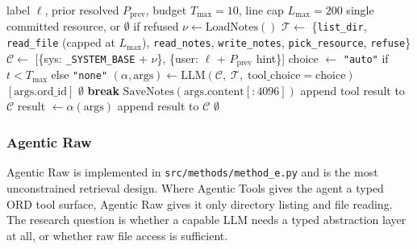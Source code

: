 \begin{algorithm}[!t]\small
  \caption{Agentic Raw --- raw file access, agentic (\texttt{src/methods/method\_e.py})}
  \label{alg:method-e}
  \begin{algorithmic}[1]
  \REQUIRE label $\ell$, prior resolved $P_{\mathrm{prev}}$, budget $T_{\max}{=}10$, line cap $L_{\max}{=}200$
  \ENSURE single committed resource, or $\emptyset$ if refused
  \STATE {}
  \STATE $\nu \leftarrow \mathrm{LoadNotes}()$ 
  \STATE $\mathcal{T} \leftarrow$ \{\texttt{list\_dir}, \texttt{read\_file} (capped at $L_{\max}$), \texttt{read\_notes}, \texttt{write\_notes}, \texttt{pick\_resource}, \texttt{refuse}\}
  \STATE $\mathcal{C} \leftarrow$ [\{sys: \texttt{\_SYSTEM\_BASE} + $\nu$\}, \{user: $\ell$ + $P_{\mathrm{prev}}$ hint\}]
    \STATE choice $\leftarrow$ \texttt{"auto"} if $t < T_{\max}$ else \texttt{"none"}
    \STATE $(\alpha, \mathrm{args}) \leftarrow \mathrm{LLM}(\mathcal{C},\; \mathcal{T},\; \mathrm{tool\_choice}{=}\mathrm{choice})$
      \RETURN $[\mathrm{args.ord\_id}]$
      \RETURN $\emptyset$
      \STATE \textbf{break}
      \STATE $\mathrm{SaveNotes}(\mathrm{args.content}[:4096])$ 
      \STATE append tool result to $\mathcal{C}$
    \ELSE
      \STATE result $\leftarrow \alpha(\mathrm{args})$ 
      \STATE append result to $\mathcal{C}$
    \ENDIF
  \ENDFOR
  \RETURN $\emptyset$ 
  \end{algorithmic}
  \end{algorithm}%

\subsubsection{Agentic Raw}

Agentic Raw is implemented in \texttt{src/methods/method\_e.py} and is the most unconstrained retrieval design. Where Agentic Tools gives the agent a typed ORD tool surface, Agentic Raw gives it only directory listing and file reading. The research question is whether a capable LLM needs a typed abstraction layer at all, or whether raw file access is sufficient.

